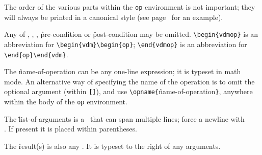 {The order of the various parts within the {\tt op} environment is not
important; they will always be printed in a canonical style (see
page~\pageref{op-ex} for an example).

Any of \cs\args, \cs\res, \cs\ext, \^{pre-condition} or
\^{post-condition} may be omitted.  \verb;\begin{vdmop}; is an
abbreviation for \verb;\begin{vdm}\begin{op};;  \verb;\end{vdmop}; is an
abbreviation for \verb;\end{op}\end{vdm};.

The \^{name-of-operation} can be any one-line expression; it is
typeset in math mode.  An alternative way of specifying the name of
the operation is to omit the optional argument (within \verb;[];), and
use \verb;\opname{;\^{name-of-operation}\verb;};, anywhere within the
body of the {\tt op} environment.

The \^{list-of-arguments} is a \mmexp\ that can span multiple lines;
force a newline with \cs\\.  If present it is placed within
parentheses.

The \^{result(s)} is also any \mmexp.  It is typeset to the right of
any arguments.

}
